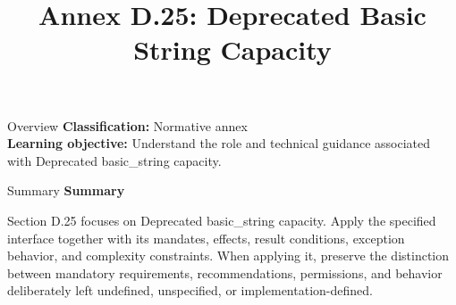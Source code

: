 \documentclass[10pt,letterpaper]{article}
\title{Annex D.25: Deprecated Basic String Capacity}
\author{}
\date{}
\begin{document}
\maketitle
\begin{CornellOverviewBox}{Overview}
\textbf{Classification:} Normative annex\\[2pt]
\textbf{Learning objective:} Understand the role and technical guidance associated with Deprecated basic\_string capacity.
\end{CornellOverviewBox}\begin{CornellSummaryBox}{Summary}
{\sffamily\bfseries\color{Accent} Summary}\par\vspace{3pt}Section D.25 focuses on Deprecated basic\_string capacity. Apply the specified interface together with its mandates, effects, result conditions, exception behavior, and complexity constraints. When applying it, preserve the distinction between mandatory requirements, recommendations, permissions, and behavior deliberately left undefined, unspecified, or implementation-defined.
\end{CornellSummaryBox}
\end{document}
